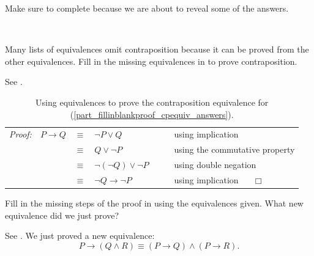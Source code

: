 Make sure to complete  because we are about to reveal some of the answers.

\begin{exam}
\label{exam_proof_logical_equiv} 
~
    \begin{apart}
        \item \label{part_fillinblankproof_cpequiv_answers} Many lists of equivalences omit contraposition because it can be proved from the other equivalences. Fill in the missing equivalences in  to prove contraposition.
            \begin{soln}
                See .
            \end{soln}
            
            \begin{table}[hbtp]
            \centering
            \begin{tabular}{lrclll}
                 \emph{Proof:} & $ P \to Q$ & $\equiv$ & $\neg P \lor Q$ & ~\hspace{.25in}~& using implication \\ 
                 & & $\equiv$ & $Q \lor \neg P$ && using the commutative property  \\ 
                 & & $\equiv$ & $\neg (\neg Q) \lor \neg P$ && using double negation \\ 
                 & & $\equiv$ & $\neg Q \to \neg P$ && using implication ~ \hfill ~$\Box$ \\ 
            \end{tabular}
            \caption{Using equivalences to prove the contraposition equivalence for  (\ref{part_fillinblankproof_cpequiv_answers}).}
            \label{tab_fillinblankproof_cpequiv_answers}
        \end{table}

        \item \label{part_fillinblanksproof_ifthenand_equiv} Fill in the missing steps of the proof in  using the equivalences given.  What new equivalence did we just prove?

            \begin{soln}
                See .  We just proved a new equivalence: $$P \to (Q \land R) \equiv (P \to Q) \land (P \to R).$$
            \end{soln}
            

\end{apart}
\end{exam}
